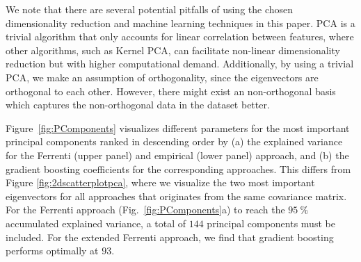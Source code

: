 \documentclass[superscriptaddress,unsortedaddress,
 amsmath,amssymb,
 aps,
]{revtex4-2}
\begin{document}
We note that there are several potential pitfalls of using the chosen dimensionality reduction and machine learning techniques in this paper. PCA is a trivial algorithm that only accounts for linear correlation between features, where other algorithms, such as Kernel PCA, can facilitate non-linear dimensionality reduction but with higher computational demand. Additionally, by using a trivial PCA, we make an assumption of orthogonality, since the eigenvectors are orthogonal to each other. However, there might exist an non-orthogonal basis which captures the non-orthogonal data in the dataset better. 


Figure~\ref{fig:PComponents} visualizes different parameters for the most important principal components ranked in descending order by (a) the explained variance for the Ferrenti (upper panel) and empirical (lower panel) approach, and (b) the gradient boosting coefficients for the corresponding approaches. This differs from Figure \ref{fig:2dscatterplotpca}, where we visualize the two most important eigenvectors for all approaches that originates from the same covariance matrix.
For the Ferrenti approach (Fig.~\ref{fig:PComponents}a) to reach the $95 \ \%$ accumulated explained variance, a total of $144$ principal components must be included. For the extended Ferrenti approach, we find that gradient boosting performs optimally at $93$. 
\end{document}
